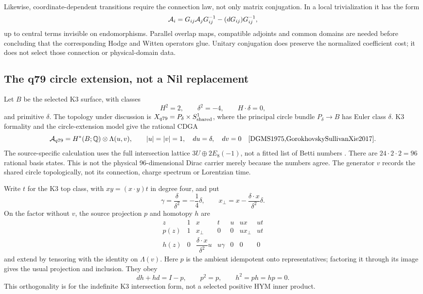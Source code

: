 \documentclass[11pt,a4paper]{article}
\begin{document}
Likewise, coordinate-dependent transitions require the connection law,
not only matrix conjugation. In a local trivialization it has the form
\[
 {\cal A}_i=G_{ij}{\cal A}_jG_{ij}^{-1}
                 -(dG_{ij})G_{ij}^{-1},
\]
up to central terms invisible on endomorphisms. Parallel overlap maps,
compatible adjoints and common domains are needed before concluding that
the corresponding Hodge and Witten operators glue. Unitary conjugation
does preserve the normalized coefficient cost; it does not select those
connection or physical-domain data.

\subsection{The q79 circle extension, not a Nil replacement}
\label{sec:q79-hirsch-model}
Let \(B\) be the selected K3 surface, with classes
\[
 H^2=2,\qquad \delta^2=-4,\qquad H\cdot\delta=0,
\]
and primitive \(\delta\). The topology under discussion is
\(X_{q79}=P_\delta\times S^1_{\rm shared}\), where the principal circle
bundle \(P_\delta\to B\) has Euler class \(\delta\).
K3 formality and the circle-extension model give the rational CDGA
\[
 {\cal A}_{q79}=H^*(B;\mathbb Q)\otimes\Lambda(u,v),\qquad
 |u|=|v|=1,\quad du=\delta,\quad dv=0
 \quad\cite{DGMS1975,GorokhovskySullivanXie2017}.
\]
The source-specific calculation uses the full intersection lattice
\(3U\oplus2E_8(-1)\), not a fitted list of Betti numbers
\cite{PreprojectionQ79Hirsch2026}. There are \(24\cdot2\cdot2=96\)
rational basis states. This is not the physical 96-dimensional Dirac
carrier merely because the numbers agree. The generator \(v\) records the
shared circle topologically, not its connection, charge spectrum or
Lorentzian time.

Write \(t\) for the K3 top class, with
\(xy=(x\cdot y)t\) in degree four, and put
\[
 \gamma=\frac{\delta}{\delta^2}=-\frac14\delta,\qquad
 x_\perp=x-\frac{\delta\cdot x}{\delta^2}\delta.
\]
On the factor without \(v\), the source projection \(p\) and homotopy \(h\)
are
\[
\begin{array}{c|cccccc}
z&1&x&t&u&ux&ut\\ \hline
p(z)&1&x_\perp&0&0&u x_\perp&ut\\
h(z)&0&\dfrac{\delta\cdot x}{\delta^2}u&u\gamma&0&0&0
\end{array}
\]
and extend by tensoring with the identity on \(\Lambda(v)\).
Here \(p\) is the ambient idempotent onto representatives; factoring it
through its image gives the usual projection and inclusion. They obey
\[
 dh+hd=I-p,\qquad p^2=p,\qquad h^2=ph=hp=0.
\]
This orthogonality is for the indefinite K3 intersection form, not a
selected positive HYM inner product.
\end{document}
